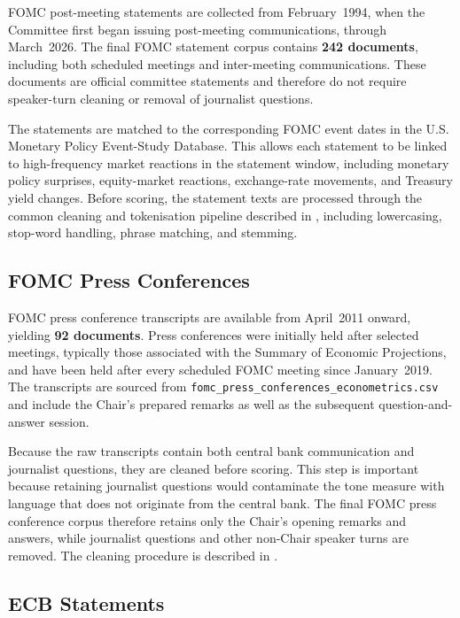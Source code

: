 FOMC post-meeting statements are collected from February~1994, when the
Committee first began issuing post-meeting communications, through
March~2026. The final FOMC statement corpus contains
\textbf{242 documents}, including both scheduled meetings and
inter-meeting communications. These documents are official committee
statements and therefore do not require speaker-turn cleaning or removal
of journalist questions.

The statements are matched to the corresponding FOMC event dates in the
U.S. Monetary Policy Event-Study Database. This allows each statement to
be linked to high-frequency market reactions in the statement window,
including monetary policy surprises, equity-market reactions,
exchange-rate movements, and Treasury yield changes. Before scoring, the
statement texts are processed through the common cleaning and
tokenisation pipeline described in ,
including lowercasing, stop-word handling, phrase matching, and stemming.

\subsection{FOMC Press Conferences}
\label{sec:data_fomc_pc}

FOMC press conference transcripts are available from April~2011 onward,
yielding \textbf{92 documents}. Press conferences were initially held
after selected meetings, typically those associated with the Summary of
Economic Projections, and have been held after every scheduled FOMC
meeting since January~2019. The transcripts are sourced from
\texttt{fomc\_press\_conferences\_econometrics.csv} and include the
Chair's prepared remarks as well as the subsequent question-and-answer
session.

Because the raw transcripts contain both central bank communication and
journalist questions, they are cleaned before scoring. This step is
important because retaining journalist questions would contaminate the
tone measure with language that does not originate from the central bank.
The final FOMC press conference corpus therefore retains only the Chair's
opening remarks and answers, while journalist questions and other
non-Chair speaker turns are removed. The cleaning procedure is described
in .

\subsection{ECB Statements}
\label{sec:data_ecb_stmt}

